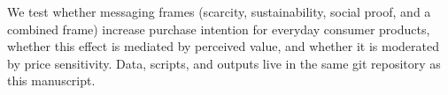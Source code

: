 We test whether messaging frames (scarcity, sustainability, social proof,
and a combined frame) increase purchase intention for everyday consumer
products, whether this effect is mediated by perceived value, and whether
it is moderated by price sensitivity. Data, scripts, and outputs live in
the same git repository as this manuscript.
